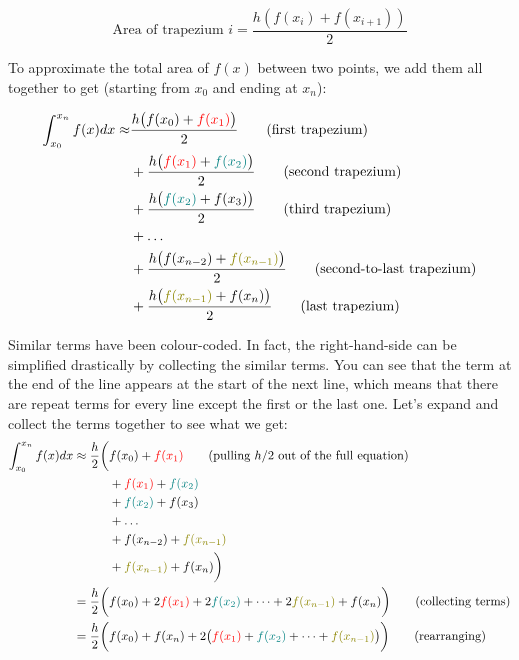 \[ \text{Area of trapezium }i = \frac{h(f(x_i) + f(x_{i+1}))}{2}\]

To approximate the total area of $f(x)$ between two points, we add them all together to get (starting from $x_0$ and ending at $x_n$):

\begin{align*}
    \int_{x_0}^{x_n}f(x) dx \approx& \frac{h\big(f(x_0) + \textcolor{red}{f(x_{1})}\big)}{2} \tag{first trapezium} \\
     &+ \frac{h\big(\textcolor{red}{f(x_{1})} + \textcolor{teal}{f(x_{2})}\big)}{2} \tag{second trapezium}\\
     &+ \frac{h\big(\textcolor{teal}{f(x_{2})} + f(x_{3})\big)}{2} \tag{third trapezium}\\
     &+ \dots \\
     &+ \frac{h\big(f(x_{n-2}) + \textcolor{olive}{f(x_{n-1})}\big)}{2} \tag{second-to-last trapezium}\\
     &+ \frac{h\big(\textcolor{olive}{f(x_{n-1})} + f(x_{n})\big)}{2} \tag{last trapezium} 
\end{align*}

Similar terms have been colour-coded. In fact, the right-hand-side can be simplified drastically by collecting the similar terms. 
You can see that the term at the end of the line appears at the start of the next line, which means that there are repeat terms for every line except 
the first or the last one. Let's expand and collect the terms together to see what we get:
\begin{align*}
    \int_{x_0}^{x_n}f(x) dx \approx \frac{h}{2}\bigg(& f(x_0) + \textcolor{red}{f(x_{1})} \tag{pulling $h/2$ out of the full equation} \\
     &+ \textcolor{red}{f(x_{1})} + \textcolor{teal}{f(x_{2})} \\
     &+ \textcolor{teal}{f(x_{2})} + f(x_{3}) \\
     &+ \dots \\
     &+ f(x_{n-2}) + \textcolor{olive}{f(x_{n-1})} \\
     &+ \textcolor{olive}{f(x_{n-1})} + f(x_{n}) \bigg) \\
     = \frac{h}{2} \bigg( & f(x_0) + 2\textcolor{red}{f(x_{1})}+ 2\textcolor{teal}{f(x_{2})}  + \dots + 2\textcolor{olive}{f(x_{n-1})}+ f(x_n)\bigg) \tag{collecting terms}\\
     = \frac{h}{2} \bigg( & f(x_0) + f(x_n) + 2\big( \textcolor{red}{f(x_{1})}+ \textcolor{teal}{f(x_{2})} + \dots + \textcolor{olive}{f(x_{n-1})}\big) \bigg)  \tag{rearranging}
\end{align*}

